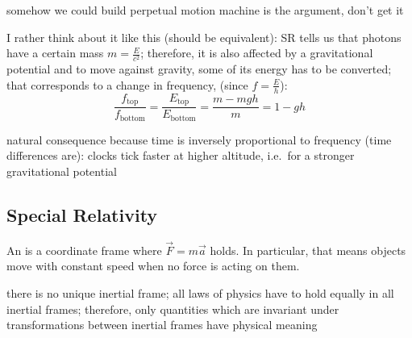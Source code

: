 \begin{ex}
somehow we could build perpetual motion machine is the argument, don't get it

I rather think about it like this (should be equivalent): SR tells us that photons have a certain mass $m = \frac{E}{c^2}$; therefore, it is also affected by a gravitational potential and to move against gravity, some of its energy has to be converted; that corresponds to a change in frequency, (since $f = \frac{E}{h}$):
\begin{equation}
\frac{f_\text{top}}{f_\text{bottom}} = \frac{E_\text{top}}{E_\text{bottom}} = \frac{m - m g h}{m} = 1 - g h
\end{equation}
\end{ex}

natural consequence because time is inversely proportional to frequency (time differences are): clocks tick faster at higher altitude, i.e.~for a stronger gravitational potential






	\subsection{Special Relativity}
\begin{defi}
An  is a coordinate frame where $\vec{F} = m \vec{a}$ holds. In particular, that means objects move with constant speed when no force is acting on them.
\end{defi}

there is no unique inertial frame; all laws of physics have to hold equally in all inertial frames; therefore, only quantities which are invariant under transformations between inertial frames have physical meaning

